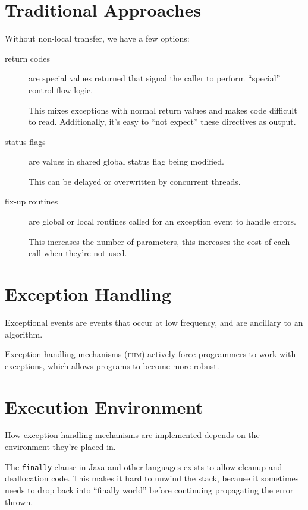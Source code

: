         \section{Traditional Approaches} %
        \label{sec:traditional_approaches}
            Without non-local transfer, we have a few options:
            \begin{description}
                \item[return codes] are special values returned that signal the caller to perform ``special'' control flow logic.

                    This mixes exceptions with normal return values and makes code difficult to read.
                    Additionally, it's easy to ``not expect'' these directives as output.
                \item[status flags] are values in shared global status flag being modified.

                    This can be delayed or overwritten by concurrent threads.
                \item[fix-up routines] are global or local routines called for an exception event to handle errors.

                    This increases the number of parameters, this increases the cost of each call when they're not used.
            \end{description}

        \section{Exception Handling} %
        \label{sec:exception_handling}
            Exceptional events are events that occur at low frequency, and are ancillary to an algorithm.

            Exception handling mechanisms (\textsc{ehm}) actively force programmers to work with exceptions, which allows programs to become more robust.

        \section{Execution Environment} %
        \label{sec:execution_environment}
            How exception handling mechanisms are implemented depends on the environment they're placed in.

            The \verb|finally| clause in Java and other languages exists to allow cleanup and deallocation code.
            This makes it hard to unwind the stack, because it sometimes needs to drop back into ``finally world'' before continuing propagating the error thrown.

